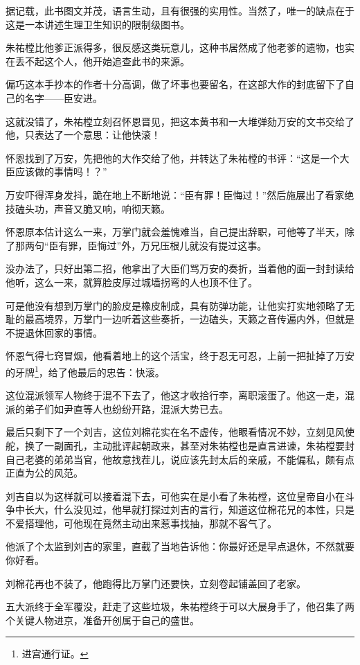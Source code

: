 \begin{multicols}{\theparacolNo}
		据记载，此书图文并茂，语言生动，且有很强的实用性。当然了，唯一的缺点在于这是一本讲述生理卫生知识的限制级图书。

		朱祐樘比他爹正派得多，很反感这类玩意儿，这种书居然成了他老爹的遗物，也实在丢不起这个人，他开始追查此书的来源。

		偏巧这本手抄本的作者十分高调，做了坏事也要留名，在这部大作的封底留下了自己的名字——臣安进。

		这就没错了，朱祐樘立刻召怀恩晋见，把这本黄书和一大堆弹劾万安的文书交给了他，只表达了一个意思：让他快滚！

		怀恩找到了万安，先把他的大作交给了他，并转达了朱祐樘的书评：“这是一个大臣应该做的事情吗！？”

		万安吓得浑身发抖，跪在地上不断地说：“臣有罪！臣悔过！”然后施展出了看家绝技磕头功，声音又脆又响，响彻天籁。

		怀恩原本估计这么一来，万掌门就会羞愧难当，自己提出辞职，可他等了半天，除了那两句“臣有罪，臣悔过”外，万兄压根儿就没有提过这事。

		没办法了，只好出第二招，他拿出了大臣们骂万安的奏折，当着他的面一封封读给他听，这么一来，就算脸皮厚过城墙拐弯的人也顶不住了。

		可是他没有想到万掌门的脸皮是橡皮制成，具有防弹功能，让他实打实地领略了无耻的最高境界，万掌门一边听着这些奏折，一边磕头，天籁之音传遍内外，但就是不提退休回家的事情。

		怀恩气得七窍冒烟，他看着地上的这个活宝，终于忍无可忍，上前一把扯掉了万安的牙牌\footnote{进宫通行证。}，给了他最后的忠告：快滚。

		这位混派领军人物终于混不下去了，他这才收拾行李，离职滚蛋了。他这一走，混派的弟子们如尹直等人也纷纷开路，混派大势已去。

		最后只剩下了一个刘吉，这位刘棉花实在名不虚传，他眼看情况不妙，立刻见风使舵，换了一副面孔，主动批评起朝政来，甚至对朱祐樘也是直言进谏，朱祐樘要封自己老婆的弟弟当官，他故意找茬儿，说应该先封太后的亲戚，不能偏私，颇有点正直为公的风范。

		刘吉自以为这样就可以接着混下去，可他实在是小看了朱祐樘，这位皇帝自小在斗争中长大，什么没见过，他早就打探过刘吉的言行，知道这位棉花兄的本性，只是不爱搭理他，可他现在竟然主动出来惹事找抽，那就不客气了。

		他派了个太监到刘吉的家里，直截了当地告诉他：你最好还是早点退休，不然就要你好看。

		刘棉花再也不装了，他跑得比万掌门还要快，立刻卷起铺盖回了老家。

		五大派终于全军覆没，赶走了这些垃圾，朱祐樘终于可以大展身手了，他召集了两个关键人物进京，准备开创属于自己的盛世。


\end{multicols}

